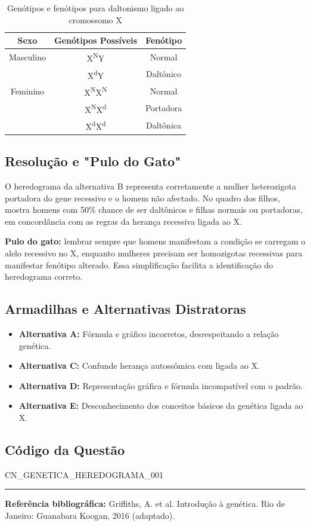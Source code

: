\documentclass{article}
\begin{document}
\begin{table}[h!]
\centering
\begin{tabular}{|c|c|c|}
\hline
\textbf{Sexo} & \textbf{Genótipos Possíveis} & \textbf{Fenótipo} \\
\hline
Masculino & X\textsuperscript{N}Y & Normal \\
           & X\textsuperscript{d}Y & Daltônico \\
\hline
Feminino  & X\textsuperscript{N}X\textsuperscript{N} & Normal \\
           & X\textsuperscript{N}X\textsuperscript{d} & Portadora \\
           & X\textsuperscript{d}X\textsuperscript{d} & Daltônica \\
\hline
\end{tabular}
\caption{Genótipos e fenótipos para daltonismo ligado ao cromossomo X}
\end{table}

\subsection*{Resolução e "Pulo do Gato"}

O heredograma da alternativa B representa corretamente a mulher heterozigota portadora do gene recessivo e o homem não afectado. No quadro dos filhos, mostra homens com 50\% chance de ser daltônicos e filhas normais ou portadoras, em concordância com as regras da herança recessiva ligada ao X.

\textbf{Pulo do gato:} lembrar sempre que homens manifestam a condição se carregam o alelo recessivo no X, enquanto mulheres precisam ser homozigotas recessivas para manifestar fenótipo alterado. Essa simplificação facilita a identificação do heredograma correto.

\subsection*{Armadilhas e Alternativas Distratoras}

\begin{itemize}
  \item \textbf{Alternativa A:} Fórmula e gráfico incorretos, desrespeitando a relação genética.
  \item \textbf{Alternativa C:} Confunde herança autossômica com ligada ao X.
  \item \textbf{Alternativa D:} Representação gráfica e fórmula incompatível com o padrão.
  \item \textbf{Alternativa E:} Desconhecimento dos conceitos básicos da genética ligada ao X.
\end{itemize}

\subsection*{Código da Questão}

CN_GENETICA_HEREDOGRAMA_001

\bigskip

\noindent\rule{\textwidth}{0.4pt}

\textbf{Referência bibliográfica:} Griffiths, A. et al. Introdução à genética. Rio de Janeiro: Guanabara Koogan, 2016 (adaptado).
\end{document}
